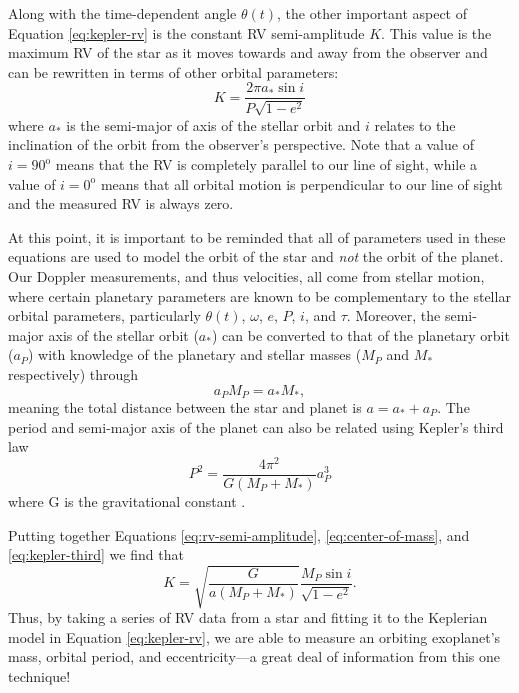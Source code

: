 Along with the time-dependent angle $\theta(t)$, the other important aspect of Equation \ref{eq:kepler-rv} is the constant RV semi-amplitude $K$. This value is the maximum RV of the star as it moves towards and away from the observer and can be rewritten in terms of other orbital parameters:
\begin{equation}
    K = \frac{2\pi a_* \sin{i}}{P\sqrt{1-e^2}}
    \label{eq:rv-semi-amplitude}
\end{equation}
where $a_*$ is the semi-major of axis of the stellar orbit and $i$ relates to the inclination of the orbit from the observer's perspective. Note that a value of $i=90^\mathrm{o}$ means that the RV is completely parallel to our line of sight, while a value of $i=0^\mathrm{o}$ means that all orbital motion is perpendicular to our line of sight and the measured RV is always zero.

At this point, it is important to be reminded that all of parameters used in these equations are used to model the orbit of the star and \textit{not} the orbit of the planet. Our Doppler measurements, and thus velocities, all come from stellar motion, where certain planetary parameters are known to be complementary to the stellar orbital parameters, particularly $\theta(t)$, $\omega$, $e$, $P$, $i$, and $\tau$. Moreover, the semi-major axis of the stellar orbit ($a_*$) can be converted to that of the planetary orbit ($a_P$) with knowledge of the planetary and stellar masses ($M_P$ and $M_*$ respectively) through
\begin{equation}
    a_P M_P = a_* M_*,
    \label{eq:center-of-mass}
\end{equation}
meaning the total distance between the star and planet is $a = a_* + a_P$. The period and semi-major axis of the planet can also be related using Kepler's third law
\begin{equation}
    P^2 = \frac{4\pi^2}{G (M_P+M_*)} a_P^3
    \label{eq:kepler-third}
\end{equation}
where G is the gravitational constant \citep{kepler_ioannis_1619}.

Putting together Equations \ref{eq:rv-semi-amplitude}, \ref{eq:center-of-mass}, and \ref{eq:kepler-third} we find that 
\begin{equation}
    K = \sqrt{ \frac{G}{a (M_P + M_*)}} \frac{M_P \sin{i}}{\sqrt{1-e^2}}.
    \label{eq:rv-semi-amplitude2}
\end{equation}
Thus, by taking a series of RV data from a star and fitting it to the Keplerian model in Equation \ref{eq:kepler-rv}, we are able to measure an orbiting exoplanet's mass, orbital period, and eccentricity---a great deal of information from this one technique!

